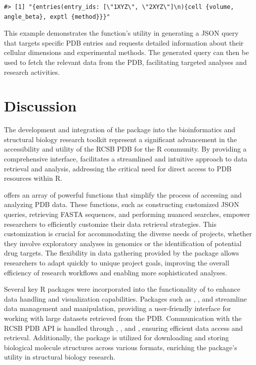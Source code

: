 \begin{verbatim}
#> [1] "{entries(entry_ids: [\"1XYZ\", \"2XYZ\"]\n){cell {volume, angle_beta}, exptl {method}}}"
\end{verbatim}

This example demonstrates the function's utility in generating a JSON query that targets specific PDB entries and requests detailed information about their cellular dimensions and experimental methods. The generated query can then be used to fetch the relevant data from the PDB, facilitating targeted analyses and research activities.

\section{Discussion}\label{discussion}

The development and integration of the  package into the bioinformatics and structural biology research toolkit represent a significant advancement in the accessibility and utility of the RCSB PDB for the R community. By providing a comprehensive interface,  facilitates a streamlined and intuitive approach to data retrieval and analysis, addressing the critical need for direct access to PDB resources within R.

 offers an array of powerful functions that simplify the process of accessing and analyzing PDB data. These functions, such as constructing customized JSON queries, retrieving FASTA sequences, and performing nuanced searches, empower researchers to efficiently customize their data retrieval strategies. This customization is crucial for accommodating the diverse needs of projects, whether they involve exploratory analyses in genomics or the identification of potential drug targets. The flexibility in data gathering provided by the package allows researchers to adapt quickly to unique project goals, improving the overall efficiency of research workflows and enabling more sophisticated analyses.

Several key R packages were incorporated into the functionality of  to enhance data handling and visualization capabilities. Packages such as  \citep{Wickham2023aa},  \citep{Wickham2023ab}, and  \citep{Bache2022aa} streamline data management and manipulation, providing a user-friendly interface for working with large datasets retrieved from the PDB. Communication with the RCSB PDB API is handled through  \citep{Wickham2023ac},  \citep{Ooms2014aa}, and  \citep{Wickham2023ad}, ensuring efficient data access and retrieval. Additionally, the  \citep{BJ2006aa} package is utilized for downloading and storing biological molecule structures across various formats, enriching the package's utility in structural biology research.

